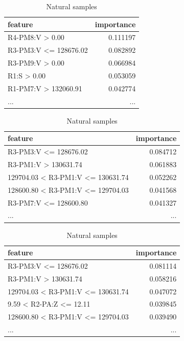 \begin{table}[H]
    \footnotesize
    \centering
    \caption{5 most important features by class for MLP classifier} \label{tab:5best_mlp}
    \begin{subtable}[t]{0.5\linewidth}
        \centering
        \caption{NoEvents samples} 
        \begin{tabular}{lr}\toprule
            feature  &importance\\\midrule            
            R4-PM8:V > 0.00        &  0.111197 \\
            R3-PM3:V <= 128676.02  &  0.082892 \\
            R3-PM9:V > 0.00        &  0.066984 \\
            R1:S > 0.00            &  0.053059 \\
            R1-PM7:V > 132060.91   &  0.042774 \\
            ...                          & ... \\\bottomrule
        \end{tabular}
    \end{subtable}%
    \begin{subtable}[t]{0.5\linewidth}
        \centering
        \caption{Attack samples} 
        \begin{tabular}{lr}\toprule
            feature                   & importance \\\midrule
            R3-PM3:V <= 128676.02              &  0.084712  \\
            R3-PM1:V > 130631.74               &  0.061883 \\
            129704.03 < R3-PM1:V <= 130631.74  &  0.052262 \\
            128600.80 < R3-PM1:V <= 129704.03  &  0.041568 \\
            R3-PM7:V <= 128600.80              &  0.041327 \\
            ...                           & ... \\\bottomrule
        \end{tabular}
    \end{subtable}
    \begin{subtable}[b]{0.5\linewidth}
        \centering\vspace*{.5cm}
        \caption{Natural samples} 
        \begin{tabular}{lr}\toprule
            feature                & importance   \\\midrule    
            R3-PM3:V <= 128676.02              &  0.081114 \\
            R3-PM1:V > 130631.74               &  0.058216 \\
            129704.03 < R3-PM1:V <= 130631.74  &  0.047072 \\
            9.59 < R2-PA:Z <= 12.11            &  0.039845 \\
            128600.80 < R3-PM1:V <= 129704.03  &  0.039490 \\
            ...                    &       ...    \\\bottomrule
        \end{tabular}
    \end{subtable}
\end{table}